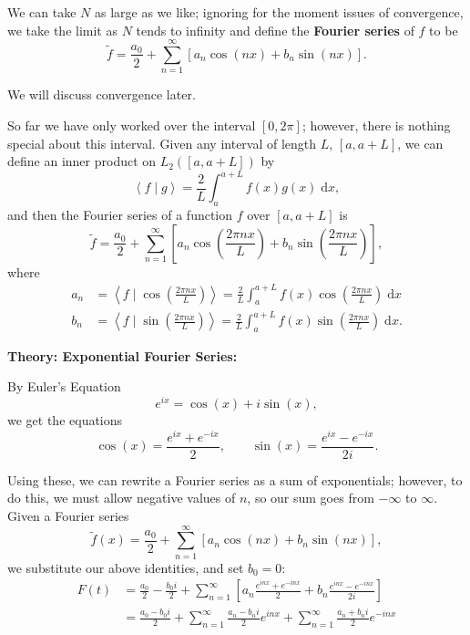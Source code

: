 \documentclass{article}
\newcommand{\diff}{\;\mathrm{d}}
\newcommand{\braket}[2]{\left\langle #1 \mid #2 \right\rangle}
\begin{document}
We can take $N$ as large as we like; ignoring for the moment issues of convergence, we take the limit as $N$ tends to infinity and define the \textbf{Fourier series} of $f$ to be
\[\tilde{f}=\frac{a_0}{2}+\sum_{n=1}^\infty \left[a_n\cos(nx) + b_n\sin(nx)\right].\]

We will discuss convergence later.\medskip

So far we have only worked over the interval $[0,2\pi]$; however, there is nothing special about this interval. Given any interval of length $L$, $[a,a+L]$, we can define an inner product on $L_2([a,a+L])$ by
\[\braket{f}{g}=\frac{2}{L}\int_a^{a+L}\!\!\! f(x)g(x)\diff x,\]
and then the Fourier series of a function $f$ over $[a,a+L]$ is
\[\tilde{f}=\frac{a_0}{2}+\sum_{n=1}^\infty \left[a_n\cos\left(\frac{2\pi nx}{L}\right) + b_n\sin\left(\frac{2\pi nx}{L}\right)\right],\]
where
\begin{align*}
	a_n&=\braket{f}{\cos\left(\frac{2\pi nx}{L}\right)}=\frac{2}{L}\int_a^{a+L}\!\!\! f(x)\cos\left(\frac{2\pi nx}{L}\right)\diff x\\
	b_n &= \braket{f}{\sin\left(\frac{2\pi nx}{L}\right)}=\frac{2}{L}\int_a^{a+L}\!\!\! f(x)\sin\left(\frac{2\pi nx}{L}\right)\diff x.
\end{align*}



\clearpage





\textbf{Theory: Exponential Fourier Series:}

\bigskip


By Euler's Equation
\[e^{ix}=\cos(x)+i\sin(x),\]
we get the equations
\[\cos(x)=\frac{e^{ix}+e^{-ix}}{2},\qquad \sin(x)=\frac{e^{ix}-e^{-ix}}{2i}.\]

Using these, we can rewrite a Fourier series as a sum of exponentials; however, to do this, we must allow negative values of $n$, so our sum goes from $-\infty$ to $\infty$. Given a Fourier series
\[\tilde{f}(x)=\frac{a_0}{2}+\sum_{n=1}^\infty \left[a_n\cos\left(nx\right) + b_n\sin\left(nx\right)\right],\]
we substitute our above identities, and set $b_0=0$:
\begin{align*}
	F(t) &= \frac{a_0}{2} - \frac{b_0i}{2} + \sum_{n=1}^\infty \left[a_n\frac{e^{inx}+e^{-inx}}{2} + b_n\frac{e^{inx}-e^{-inx}}{2i}\right]\\
	&= \frac{a_0-b_0i}{2} + \sum_{n=1}^\infty \frac{a_n-b_ni}{2}e^{inx} + \sum_{n=1}^\infty \frac{a_n+b_ni}{2}e^{-inx}
\end{align*}
\end{document}
